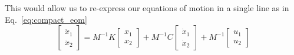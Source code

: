 This would allow us to re-express our equations of motion in a single line as in Eq.~\ref{eq:compact_eom}
\begin{equation}
    \begin{bmatrix}
        \ddot{x}_1 \\ \ddot{x}_2
    \end{bmatrix}
    = M^{-1}K
    \begin{bmatrix}
        x_1 \\ x_2
    \end{bmatrix}
    + M^{-1}C
    \begin{bmatrix}
        \dot{x}_1 \\ \dot{x}_2
    \end{bmatrix}
    + M^{-1}
    \begin{bmatrix}
        u_1 \\ u_2
    \end{bmatrix}
    \label{eq:compact_eom}
\end{equation}

